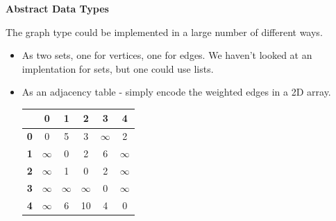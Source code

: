 \documentclass[a4,portraitt]{slides}
\begin{document}
\newpage
{\samepage
\begin{center}
{\Large{\bf Abstract Data Types}}
\end{center}

The graph type could be implemented in a large number
of different ways.
\begin{itemize}
\item As two sets, one for vertices, one for edges.
We haven't looked at an implentation for sets, but one could use lists.
\item As an adjacency table - simply encode the weighted edges in a 2D array.
\begin{center}
\begin{tabular}{|c|ccccc|}\hline
& {\bf 0} & {\bf 1} & {\bf 2} & {\bf 3} & {\bf 4} \\ \hline
{\bf 0} & 0 & 5 & 3 & $\infty$ & 2 \\
{\bf 1} & $\infty$ & 0 & 2 & 6 & $\infty$ \\
{\bf 2} & $\infty$ & 1 & 0 & 2 & $\infty$ \\
{\bf 3} & $\infty$ &$\infty$ &$\infty$ & 0 & $\infty$ \\
{\bf 4} & $\infty$ & 6 & 10 & 4 & 0 \\ \hline
\end{tabular}
\end{center}
\end{itemize}
}
\end{document}
